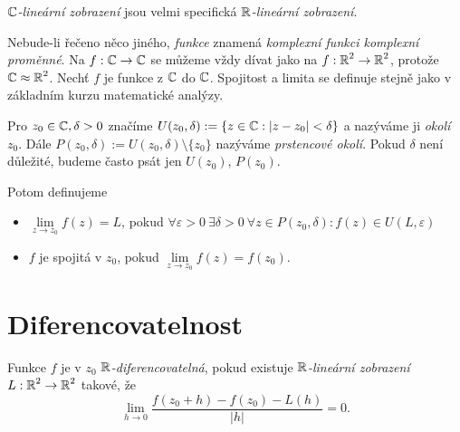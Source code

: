 \begin{note}
$\operatorname{\mathbb{C}}  $\emph{-lineární zobrazení} jsou velmi specifická $\operatorname{\mathbb{R}} $\emph{-lineární zobrazení}.
\end{note}

\begin{agreement}
Nebude-li řečeno něco jiného, \emph{funkce} znamená \emph{komplexní funkci komplexní proměnné}. Na $f: \operatorname{\mathbb{C}}   \to \operatorname{\mathbb{C}}  $ se můžeme vždy dívat jako na $f: \operatorname{\mathbb{R}} ^2 \to \operatorname{\mathbb{R}} ^2$, protože $\operatorname{\mathbb{C}}  \approx\operatorname{\mathbb{R}} ^2$.
Nechť $f$ je funkce z $\operatorname{\mathbb{C}}  $ do $\operatorname{\mathbb{C}}  $. Spojitost a limita se definuje stejně jako v základním kurzu matematické analýzy.
\end{agreement}
\begin{definition}
Pro $z_0\in\operatorname{\mathbb{C}}  , \delta>0$ značíme $U(z_0,\delta):= \{z\in\operatorname{\mathbb{C}}  : |z-z_0|<\delta\}$ a nazýváme ji \emph{okolí} $z_0$. Dále $P(z_0,\delta):= U(z_0,\delta)\setminus\{z_0\}$ nazýváme \emph{prstencové okolí}. Pokud $\delta$ není důležité, budeme často psát jen $U(z_0)$, $P(z_0)$.

Potom definujeme
\begin{itemize}
    \item $\underset{{z\to z_0}}{\lim}{f(z)} = L$, pokud $\forall\varepsilon>0\ \exists\delta>0\ \forall{z\in P(z_0,\delta)}: f(z)\in U(L, \varepsilon)$
    \item $f$ je spojitá v $z_0$, pokud $\underset{{z\to z_0}}{\lim}{f(z)} = f(z_0)$.
\end{itemize}
\end{definition} 


\section{Diferencovatelnost}
\begin{definition}
Funkce $f$ je v $z_0$ $\operatorname{\mathbb{R}} $\emph{-diferencovatelná}, pokud existuje $\operatorname{\mathbb{R}} $\emph{-lineární zobrazení} \\$L: \operatorname{\mathbb{R}} ^2\to\operatorname{\mathbb{R}} ^2$ takové, že
$$\lim_{h\to 0}\frac{f(z_0+h)-f(z_0)-L(h)}{|h|} = 0.$$
\end{definition} 

